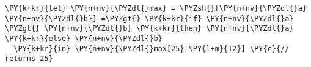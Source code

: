 \begin{Verbatim}[commandchars=\\\{\}]
\PY{k+kr}{let} \PY{n+nv}{\PYZdl{}max} = \PYZsh{}[\PY{n+nv}{\PYZdl{}a} \PY{n+nv}{\PYZdl{}b}] =\PYZgt{} \PY{k+kr}{if} \PY{n+nv}{\PYZdl{}a} \PYZgt{} \PY{n+nv}{\PYZdl{}b} \PY{k+kr}{then} \PY{n+nv}{\PYZdl{}a} \PY{k+kr}{else} \PY{n+nv}{\PYZdl{}b}
  \PY{k+kr}{in} \PY{n+nv}{\PYZdl{}max[25} \PY{l+m}{12}] \PY{c}{// returns 25}
\end{Verbatim}
